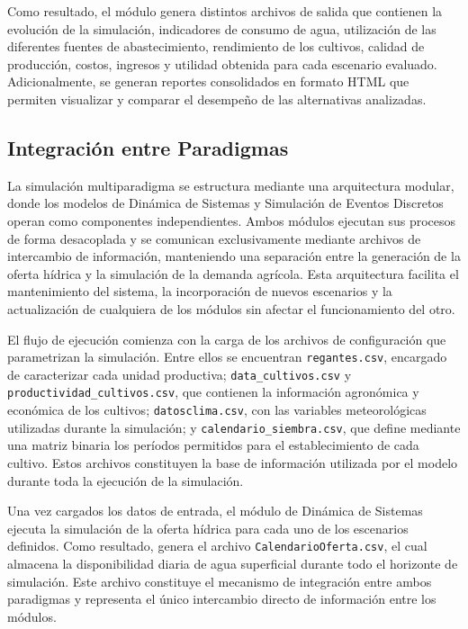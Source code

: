 \documentclass[12pt]{report}
\begin{document}
Como resultado, el módulo genera distintos archivos de salida que contienen la evolución de la simulación, indicadores de consumo de agua, utilización de las diferentes fuentes de abastecimiento, rendimiento de los cultivos, calidad de producción, costos, ingresos y utilidad obtenida para cada escenario evaluado. Adicionalmente, se generan reportes consolidados en formato HTML que permiten visualizar y comparar el desempeño de las alternativas analizadas.


\subsection{Integración entre Paradigmas}

La simulación multiparadigma se estructura mediante una arquitectura modular, donde los modelos de Dinámica de Sistemas y Simulación de Eventos Discretos operan como componentes independientes. Ambos módulos ejecutan sus procesos de forma desacoplada y se comunican exclusivamente mediante archivos de intercambio de información, manteniendo una separación entre la generación de la oferta hídrica y la simulación de la demanda agrícola. Esta arquitectura facilita el mantenimiento del sistema, la incorporación de nuevos escenarios y la actualización de cualquiera de los módulos sin afectar el funcionamiento del otro.

El flujo de ejecución comienza con la carga de los archivos de configuración que parametrizan la simulación. Entre ellos se encuentran \texttt{regantes.csv}, encargado de caracterizar cada unidad productiva; \texttt{data\_cultivos.csv} y \texttt{productividad\_cultivos.csv}, que contienen la información agronómica y económica de los cultivos; \texttt{datosclima.csv}, con las variables meteorológicas utilizadas durante la simulación; y \texttt{calendario\_siembra.csv}, que define mediante una matriz binaria los períodos permitidos para el establecimiento de cada cultivo. Estos archivos constituyen la base de información utilizada por el modelo durante toda la ejecución de la simulación.

Una vez cargados los datos de entrada, el módulo de Dinámica de Sistemas ejecuta la simulación de la oferta hídrica para cada uno de los escenarios definidos. Como resultado, genera el archivo \texttt{CalendarioOferta.csv}, el cual almacena la disponibilidad diaria de agua superficial durante todo el horizonte de simulación. Este archivo constituye el mecanismo de integración entre ambos paradigmas y representa el único intercambio directo de información entre los módulos.
\end{document}
